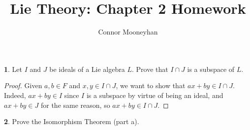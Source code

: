 \documentclass[12pt]{article}
\title{Lie Theory: Chapter 2 Homework}
\author{Connor Mooneyhan}
\date{}
\theoremstyle{definition}
\newtheorem{ex}{}
\begin{document}
\maketitle

\begin{ex}
	Let $I$ and $J$ be ideals of a Lie algebra $L$.
	Prove that $I \cap J$ is a subspace of $L$.
\end{ex}
\begin{proof}
	Given $a, b \in F$ and $x, y \in I \cap J$, we want to show that $ax + by \in I\cap J$.
	Indeed, $ax+by \in I$ since $I$ is a subspace by virtue of being an ideal, and $ax + by \in J$ for the same reason, so $ax + by \in I \cap J$.
\end{proof}

\begin{ex}
	Prove the Isomorphism Theorem (part a).
\end{ex}
\end{document}
